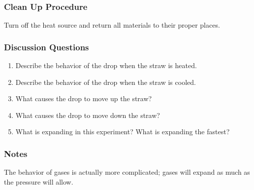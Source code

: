 \subsubsection*{Clean Up Procedure}
Turn off the heat source and return all materials to their proper places.

\subsubsection*{Discussion Questions}
\begin{enumerate}
\item{Describe the behavior of the drop when the straw is heated.} 
\item{Describe the behavior of the drop when the straw is cooled.} 
\item{What causes the drop to move up the straw?}
\item{What causes the drop to move down the straw?}
\item{What is expanding in this experiment? What is expanding the fastest?}
\end{enumerate}

\subsubsection*{Notes}
The behavior of gases is actually more complicated; gases will expand as much as the pressure will allow.


